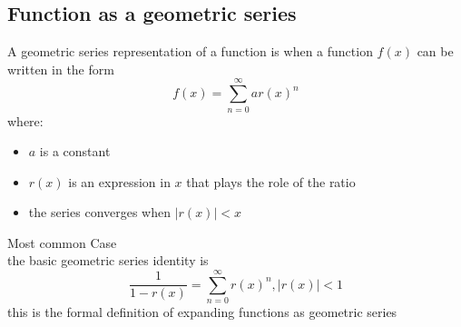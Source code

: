 \documentclass{article}
\begin{document}
                                        \subsection{Function as a geometric series}
                                            A geometric series representation of a function is when a  function \(f(x)\) can be written in the form 
                                                \[f(x) = \sum_{n = 0}^{\infty}ar{(x)}^n\]
                                            where: 
                                            \begin{itemize}
                                                \item \(a\) is a constant 
                                                \item \(r(x)\) is an expression in \(x\) that plays the role of the ratio
                                                \item the series converges when \(|r(x)| < x\)
                                            \end{itemize}
                                            Most common Case\\ 
                                            the basic geometric series identity is 
                                                \[\frac{1}{1 - r(x)} = \sum_{n = 0}^{\infty} r{(x)}^n , |r(x)| < 1\]
                                            this is the formal definition of expanding functions as geometric series 
                                        
\end{document}
